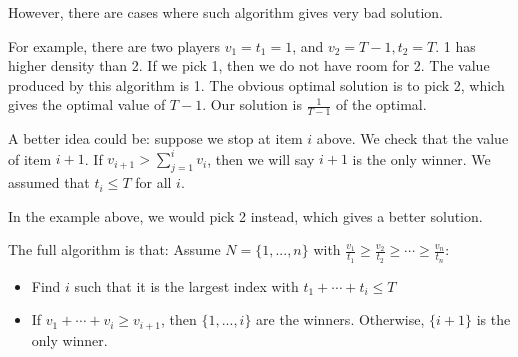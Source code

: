 \documentclass[twoside]{article}
\begin{document}
	However, there are cases where such algorithm gives very bad solution. 
	
	For example, there are two players $v_1 = t_1 = 1$, and $v_2 = T - 1, t_2 = T$. 1 has higher density than 2. If we pick 1, then we do not have room for 2. The value produced by this algorithm is 1. The obvious optimal solution is to pick 2, which gives the optimal value of $T - 1$. Our solution is $\frac{1}{T - 1}$ of the optimal. 
	
	A better idea could be: suppose we stop at item $i$ above. We check that the value of item $i+1$. If $v_{i+1} > \sum_{j = 1}^{i} v_i$, then we will say $i+1$ is the only winner. We assumed that $t_i \leq T$ for all $i$. 
	
	In the example above, we would pick 2 instead, which gives a better solution. 
	
	The full algorithm is that: Assume $N = \{1, ..., n\}$ with $\frac{v_1}{t_1} \geq \frac{v_2}{t_2} \geq \cdots \geq \frac{v_n}{t_n}$: \begin{itemize}
	\item Find $i$ such that it is the largest index with $t_1 + \cdots + t_i \leq T$
	\item If $v_1 + \cdots + v_i \geq v_{i+1}$, then $\{1, ..., i\}$ are the winners. Otherwise, $\{i+1\}$ is the only winner. 
	\end{itemize}
	
\end{document}
